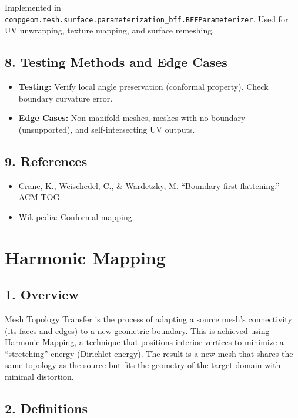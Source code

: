 Implemented in \texttt{compgeom.mesh.surface.parameterization\_bff.BFFParameterizer}. Used for UV unwrapping, texture mapping, and surface remeshing.

\subsection{8. Testing Methods and Edge Cases}

\begin{itemize}
    \item \textbf{Testing:} Verify local angle preservation (conformal property). Check boundary curvature error.
    \item \textbf{Edge Cases:} Non-manifold meshes, meshes with no boundary (unsupported), and self-intersecting UV outputs.
\end{itemize}

\subsection{9. References}

\begin{itemize}
    \item Crane, K., Weischedel, C., \& Wardetzky, M. \cite{crane2017} ``Boundary first flattening.'' ACM TOG.
    \item Wikipedia: Conformal mapping.
\end{itemize}

\section{Harmonic Mapping}
\label{sec:harmonic_mapping}

\subsection{1. Overview}

Mesh Topology Transfer is the process of adapting a source mesh's connectivity (its faces and edges) to a new geometric boundary. This is achieved using Harmonic Mapping, a technique that positions interior vertices to minimize a ``stretching'' energy (Dirichlet energy). The result is a new mesh that shares the same topology as the source but fits the geometry of the target domain with minimal distortion.

\subsection{2. Definitions}

